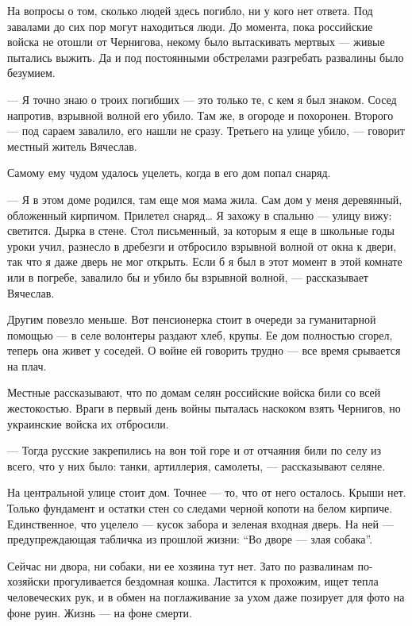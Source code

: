 На вопросы о том, сколько людей здесь погибло, ни у кого нет ответа. Под
завалами до сих пор могут находиться люди. До момента, пока российские войска
не отошли от Чернигова, некому было вытаскивать мертвых — живые пытались
выжить. Да и под постоянными обстрелами разгребать развалины было безумием. 

— Я точно знаю о троих погибших — это только те, с кем я был знаком. Сосед
напротив, взрывной волной его убило. Там же, в огороде и похоронен. Второго —
под сараем завалило, его нашли не сразу. Третьего на улице убило, — говорит
местный житель Вячеслав. 

Самому ему чудом удалось уцелеть, когда в его дом попал снаряд. 

— Я в этом доме родился, там еще моя мама жила. Сам дом у меня деревянный,
обложенный кирпичом. Прилетел снаряд… Я захожу в спальню — улицу вижу:
светится. Дырка в стене. Стол письменный, за которым я еще в школьные годы
уроки учил, разнесло в дребезги и отбросило взрывной волной от окна к двери,
так что я даже дверь не мог открыть. Если б я был в этот момент в этой комнате
или в погребе, завалило бы и убило бы взрывной волной, — рассказывает Вячеслав.


Другим повезло меньше. Вот пенсионерка стоит в очереди за гуманитарной помощью
— в селе волонтеры раздают хлеб, крупы. Ее дом полностью сгорел, теперь она
живет у соседей. О войне ей говорить трудно — все время срывается на плач. 

Местные рассказывают, что по домам селян российские войска били со всей
жестокостью. Враги в первый день войны пыталась наскоком взять Чернигов, но
украинские войска их отбросили. 

— Тогда русские закрепились на вон той горе и от отчаяния били по селу из
всего, что у них было: танки, артиллерия, самолеты, — рассказывают селяне. 

На центральной улице стоит дом. Точнее — то, что от него осталось. Крыши нет.
Только фундамент и остатки стен со следами черной копоти на белом кирпиче.
Единственное, что уцелело — кусок забора и зеленая входная дверь. На ней —
предупреждающая табличка из прошлой жизни: \enquote{Во дворе — злая собака}. 

Сейчас ни двора, ни собаки, ни ее хозяина тут нет. Зато по развалинам
по-хозяйски прогуливается бездомная кошка. Ластится к прохожим, ищет тепла
человеческих рук, и в обмен на поглаживание за ухом даже позирует для фото на
фоне руин. Жизнь — на фоне смерти. 

